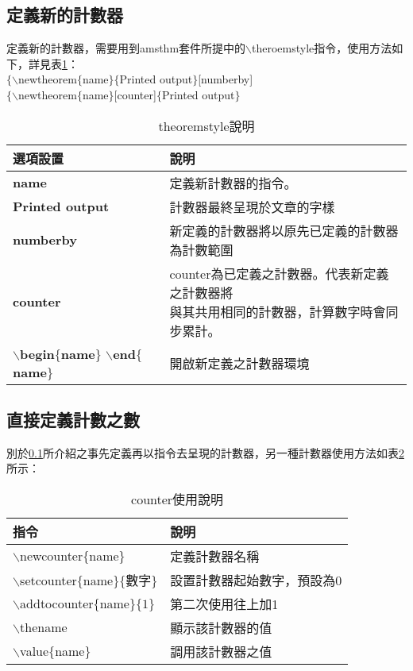 \subsection{{\HC 定義新的計數器}}\label{counter_def}
	定義新的計數器，需要用到amsthm套件所提中的$\backslash$theroemstyle指令，使用方法如下，詳見表\ref{counter_thmstyle}：\\
      \indent $\{\backslash$newtheorem$\{$name$\}\{$Printed output$\}$[numberby]\\
      \indent $\{\backslash$newtheorem$\{$name$\}$[counter]$\{$Printed output$\}$\\
	\begin{table}[H]
	\centering
	\extrarowheight=4pt
	\caption{theoremstyle說明}\label{counter_thmstyle}
		\begin{tabular}{ll}
		\hline
		選項設置 & 說明 \\
		\hline
		\textbf{name} & 定義新計數器的指令。 \\
		\rowcolor{lavendergray}
		\textbf{Printed output} & 計數器最終呈現於文章的字樣 \\
		\textbf{numberby} & 新定義的計數器將以原先已定義的計數器為計數範圍 \\
		\rowcolor{lavendergray}
		\textbf{counter} & \tabincell{ll}{counter為已定義之計數器。代表新定義之計數器將\\與其共用相同的計數器，計算數字時會同步累計。} \\
		\tabincell{ll}{\textbf{$\backslash$begin$\{$name$\}$}\\ \textbf{$\backslash$end$\{$name$\}$}} & 開啟新定義之計數器環境 \\
		\hline
		\end{tabular}
	\end{table}

\subsection{{\HC 直接定義計數之數}}
	別於\ref{counter_def}所介紹之事先定義再以指令去呈現的計數器，另一種計數器使用方法如表\ref{counter_numb}所示：
	\begin{table}[H]
	\centering
	\extrarowheight=4pt
	\caption{counter使用說明}\label{counter_numb}
		\begin{tabular}{ll}
		\hline
		指令  & 說明 \\
		\hline
		$\backslash$newcounter$\{$name$\}$ & 定義計數器名稱 \\				\rowcolor{lavendergray}
		$\backslash$setcounter$\{$name$\}\{$數字$\}$ & 設置計數器起始數字，預設為0 \\
		$\backslash$addtocounter$\{$name$\}\{1\}$ & 第二次使用往上加1 \\
		\rowcolor{lavendergray}
		$\backslash$thename & 顯示該計數器的值 \\
		$\backslash$value$\{$name$\}$ & 調用該計數器之值 \\
		\hline
		\end{tabular}
	\end{table}
	
